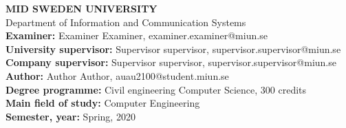 \restoregeometry
\vspace*{\fill}
{\normalfont\sffamily
    \noindent\textbf{MID SWEDEN UNIVERSITY}\\
    Department of Information and Communication Systems\\
    \textbf{Examiner:} Examiner Examiner, examiner.examiner@miun.se\\
    \textbf{University supervisor:} Supervisor supervisor, supervisor.supervisor@miun.se\\
    \textbf{Company supervisor:} Supervisor supervisor, supervisor.supervisor@miun.se\\
    \textbf{Author:} Author Author, auau2100@student.miun.se\\
    \textbf{Degree programme:} Civil engineering Computer Science, 300 credits\\
    \textbf{Main field of study:} Computer Engineering\\
    \textbf{Semester, year:} Spring, 2020  \\
}
